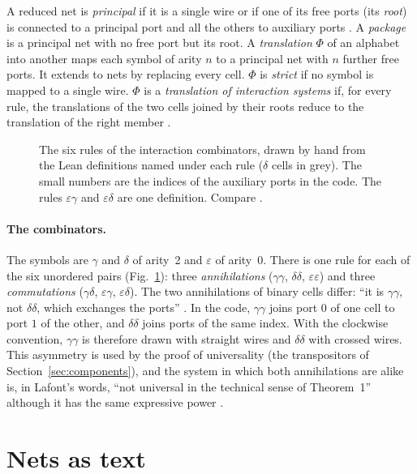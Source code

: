 \documentclass[11pt,a4paper]{article}
\newcommand{\pp}[1]{\cite[#1]{lafont1997}}
\begin{document}
A reduced net is \emph{principal} if it is a single wire or if one of its free ports (its
\emph{root}) is connected to a principal port and all the others to auxiliary ports
\pp{pp.~79--80}. A \emph{package} is a principal net with no free port but its root. A
\emph{translation} $\Phi$ of
an alphabet into another maps each symbol of arity $n$ to a principal net with $n$ further free
ports. It extends to nets by replacing every cell. $\Phi$ is \emph{strict} if no symbol is
mapped to a single wire. $\Phi$ is a \emph{translation of interaction systems} if, for every
rule, the translations of the two cells joined by their roots reduce to the translation of the
right member \pp{pp.~80--81}.

\begin{figure}[H]
\centering

\caption{The six rules of the interaction combinators, drawn by hand from the Lean definitions
named under each rule ($\delta$ cells in grey). The small numbers are the indices of the
auxiliary ports in the code. The rules $\varepsilon\gamma$ and $\varepsilon\delta$ are one
definition. Compare \pp{Fig.~2, p.~81}.}
\label{fig:rules}
\end{figure}

\paragraph{The combinators.}
The symbols are $\gamma$ and $\delta$ of arity~2 and $\varepsilon$ of arity~0. There is one
rule for each of the six unordered pairs (Fig.~\ref{fig:rules}): three \emph{annihilations}
($\gamma\gamma$, $\delta\delta$, $\varepsilon\varepsilon$) and three \emph{commutations}
($\gamma\delta$, $\varepsilon\gamma$, $\varepsilon\delta$). The two annihilations of binary
cells differ: ``it is $\gamma\gamma$, not $\delta\delta$, which exchanges the ports''
\pp{p.~82}. In the code, $\gamma\gamma$ joins port $0$ of one cell to port $1$ of the other,
and $\delta\delta$ joins ports of the same index. With the clockwise convention, $\gamma\gamma$
is therefore drawn with straight wires and $\delta\delta$ with crossed wires. This asymmetry is used by the proof of universality (the transpositors of
Section~\ref{sec:components}), and the system in which both annihilations are alike is, in Lafont's
words, ``not universal in the technical sense of Theorem~1'' although it has the same
expressive power \pp{p.~97}.

\section{Nets as text}
\label{sec:text}
\end{document}
